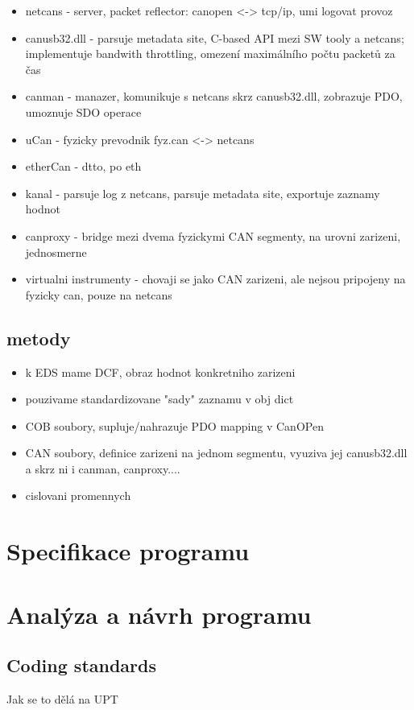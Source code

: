 \documentclass[
  field=ainfk,
  biblatex,
  glossaries,
  index
]{kidiplom}
\begin{document}
\begin{itemize}
    \item netcans - server, packet reflector: canopen <-> tcp/ip, umi logovat provoz 
    \item canusb32.dll - parsuje metadata site, C-based API mezi SW tooly a netcans; implementuje bandwith throttling, omezení maximálního počtu packetů za čas
    \item canman - manazer, komunikuje s netcans skrz canusb32.dll, zobrazuje PDO, umoznuje SDO operace
    \item uCan - fyzicky prevodnik fyz.can <-> netcans
    \item etherCan - dtto, po eth
    \item kanal - parsuje log z netcans, parsuje metadata site, exportuje zaznamy hodnot 
    \item canproxy - bridge mezi dvema fyzickymi CAN segmenty, na urovni zarizeni, jednosmerne
    \item virtualni instrumenty - chovaji se jako CAN zarizeni, ale nejsou pripojeny na fyzicky can, pouze na netcans
\end{itemize}

\subsection{metody}

\begin{itemize}
    \item k EDS mame DCF, obraz hodnot konkretniho zarizeni 
    \item pouzivame standardizovane "sady" zaznamu v obj dict
    \item COB soubory, supluje/nahrazuje PDO mapping v CanOPen
    \item CAN soubory, definice zarizeni na jednom segmentu, vyuziva jej canusb32.dll a skrz ni i canman, canproxy.... 
    \item cislovani promennych
\end{itemize}

\section{Specifikace programu}

\section{Analýza a návrh programu}

\subsection{Coding standards}
Jak se to dělá na UPT
\end{document}
